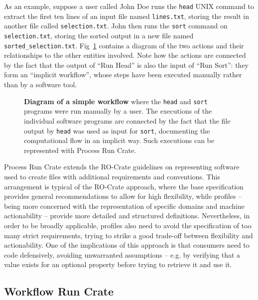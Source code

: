 \documentclass[10pt,letterpaper]{article}
\begin{document}
As an example,
suppose a user called John Doe runs the \texttt{head} UNIX command to extract the first ten lines of an input file named \texttt{lines.txt}, storing the result in another file called \texttt{selection.txt}.
John then runs the \texttt{sort}
command on \texttt{selection.txt}, storing the sorted output in a new file named \texttt{sorted\_selection.txt}.
Fig~\ref{fig:head_sort} contains a diagram of the two actions and their relationships to the other entities involved.
Note how the actions are connected by the fact that the output of ``Run Head'' is also the input of ``Run Sort'': they form an ``implicit workflow'', whose steps have been executed manually rather than by a software tool.

\begin{figure}[!ht]
\caption{{\bf Diagram of a simple workflow} where the \texttt{head} and \texttt{sort} programs were run manually by a user.
The executions of the individual software programs are connected by the fact that the file output by \texttt{head} was used as input for \texttt{sort}, documenting the computational flow in an implicit way.
Such executions can be represented with Process Run Crate.}
\label{fig:head_sort}
\end{figure}


Process Run Crate extends the RO-Crate guidelines on representing software used to create files with additional requirements and conventions.
This arrangement is typical of the RO-Crate approach, where the base specification provides general recommendations to allow for high flexibility, while profiles -- being more concerned with the representation of specific domains and machine actionability -- provide more detailed and structured definitions.
Nevertheless, in order to be broadly applicable, profiles also need to avoid the specification of too many strict requirements, trying to strike a good trade-off between flexibility and actionability.
One of the implications of this approach is that consumers need to code defensively, avoiding unwarranted assumptions -- e.g. by verifying that a value exists for an optional property before trying to retrieve it and use it.


\subsection{Workflow Run Crate}\label{workflow-run-crate}
\end{document}
